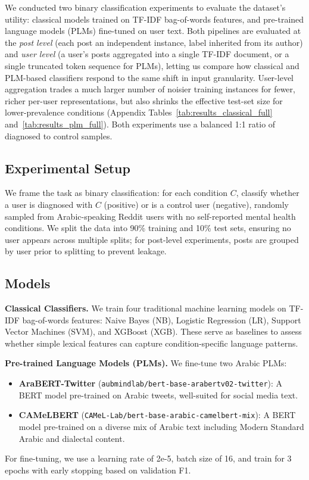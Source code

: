 \documentclass[letterpaper]{article} %
\begin{document}
We conducted two binary classification experiments to evaluate the dataset's utility: classical models trained on TF-IDF bag-of-words features, and pre-trained language models (PLMs) fine-tuned on user text. Both pipelines are evaluated at the \textit{post level} (each post an independent instance, label inherited from its author) and \textit{user level} (a user's posts aggregated into a single TF-IDF document, or a single truncated token sequence for PLMs), letting us compare how classical and PLM-based classifiers respond to the same shift in input granularity. User-level aggregation trades a much larger number of noisier training instances for fewer, richer per-user representations, but also shrinks the effective test-set size for lower-prevalence conditions (Appendix Tables~\ref{tab:results_classical_full} and~\ref{tab:results_plm_full}). Both experiments use a balanced 1:1 ratio of diagnosed to control samples.

\subsection{Experimental Setup}
\label{subsec:setup}

We frame the task as binary classification: for each condition $C$, classify whether a user is diagnosed with $C$ (positive) or is a control user (negative), randomly sampled from Arabic-speaking Reddit users with no self-reported mental health conditions. We split the data into 90\% training and 10\% test sets, ensuring no user appears across multiple splits; for post-level experiments, posts are grouped by user prior to splitting to prevent leakage.


\subsection{Models}
\label{subsec:models}

\textbf{Classical Classifiers.} We train four traditional machine learning models on TF-IDF bag-of-words features: Naive Bayes (NB), Logistic Regression (LR), Support Vector Machines (SVM), and XGBoost (XGB). These serve as baselines to assess whether simple lexical features can capture condition-specific language patterns.

\textbf{Pre-trained Language Models (PLMs).} We fine-tune two Arabic PLMs:
\begin{itemize}
    \item \textbf{AraBERT-Twitter} (\texttt{aubmindlab/bert-base-arabertv02-twitter}): A BERT model pre-trained on Arabic tweets, well-suited for social media text.
    \item \textbf{CAMeLBERT} (\texttt{CAMeL-Lab/bert-base-arabic-camelbert-mix}): A BERT model pre-trained on a diverse mix of Arabic text including Modern Standard Arabic and dialectal content.
\end{itemize}
For fine-tuning, we use a learning rate of 2e-5, batch size of 16, and train for 3 epochs with early stopping based on validation F1.
\end{document}
